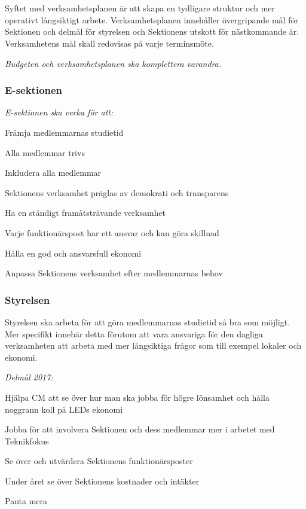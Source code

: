 \documentclass[10pt]{article}
\begin{document}
\section*{\doctitle}

Syftet med verksamhetsplanen är att skapa en tydligare struktur och mer operativt långsiktigt arbete. Verksamhetsplanen innehåller övergripande mål för Sektionen och delmål för styrelsen och Sektionens utskott för nästkommande år. Verksamhetens mål skall redovisas på varje terminsmöte.

\emph{Budgeten och verksamhetsplanen ska komplettera varandra.}

\subsubsection*{E-sektionen}
\emph{E-sektionen ska verka för att:}
\begin{dashlist}
    \item Främja medlemmarnas studietid
    \item Alla medlemmar trivs
    \item Inkludera alla medlemmar
    \item Sektionens verksamhet präglas av demokrati och transparens
    \item Ha en ständigt framåtsträvande verksamhet
    \item Varje funktionärspost har ett ansvar och kan göra skillnad
    \item Hålla en god och ansvarsfull ekonomi
    \item Anpassa Sektionens verksamhet efter medlemmarnas behov
\end{dashlist}

\subsubsection*{Styrelsen}
Styrelsen ska arbeta för att göra medlemmarnas studietid så bra som möjligt. Mer specifikt innebär detta förutom att vara ansvariga för den dagliga verksamheten att arbeta med mer långsiktiga frågor som till exempel lokaler och ekonomi.

\emph{Delmål 2017:}
\begin{dashlist}
    \item Hjälpa CM att se över hur man ska jobba för högre lönsamhet och hålla noggrann koll på LEDs ekonomi
    \item Jobba för att involvera Sektionen och dess medlemmar mer i arbetet med Teknikfokus
    \item Se över och utvärdera Sektionens funktionärsposter
    \item Under året se över Sektionens kostnader och intäkter
    \item Panta mera \scalebox{0.5}{\recycle}
\end{dashlist}
\end{document}
